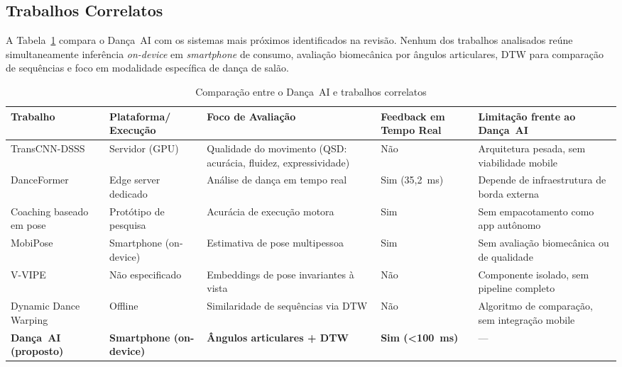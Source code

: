 \subsection{Trabalhos Correlatos}
\label{sub:correlatos}

A Tabela~\ref{tab:correlatos} compara o Dança~AI com os sistemas mais próximos
identificados na revisão. Nenhum dos trabalhos analisados reúne simultaneamente
inferência \textit{on-device} em \textit{smartphone} de consumo, avaliação
biomecânica por ângulos articulares, DTW para comparação de sequências e foco
em modalidade específica de dança de salão.

\begin{table}[h]
\centering
\caption{Comparação entre o Dança~AI e trabalhos correlatos}
\label{tab:correlatos}
\begin{tabular}{p{2.6cm}p{2.6cm}p{3cm}p{1.6cm}p{3.4cm}}
\hline
\textbf{Trabalho} & \textbf{Plataforma/ Execução} & \textbf{Foco de Avaliação} & \textbf{Feedback em Tempo Real} & \textbf{Limitação frente ao Dança~AI} \\
\hline
TransCNN-DSSS~\cite{Qu2024} & Servidor (GPU) & Qualidade do movimento (QSD: acurácia, fluidez, expressividade) & Não & Arquitetura pesada, sem viabilidade mobile \\
DanceFormer~\cite{danceformer} & Edge server dedicado & Análise de dança em tempo real & Sim (35,2~ms) & Depende de infraestrutura de borda externa \\
Coaching baseado em pose~\cite{stanford_ai_dance_coaching} & Protótipo de pesquisa & Acurácia de execução motora & Sim & Sem empacotamento como app autônomo \\
MobiPose~\cite{zhang2020mobipose} & Smartphone (on-device) & Estimativa de pose multipessoa & Sim & Sem avaliação biomecânica ou de qualidade \\
V-VIPE~\cite{levy2024v} & Não especificado & Embeddings de pose invariantes à vista & Não & Componente isolado, sem pipeline completo \\
Dynamic Dance Warping~\cite{dynamic_dance_warping} & Offline & Similaridade de sequências via DTW & Não & Algoritmo de comparação, sem integração mobile \\
\textbf{Dança~AI (proposto)} & \textbf{Smartphone (on-device)} & \textbf{Ângulos articulares + DTW} & \textbf{Sim (<100~ms)} & --- \\
\hline
\end{tabular}
\end{table}
